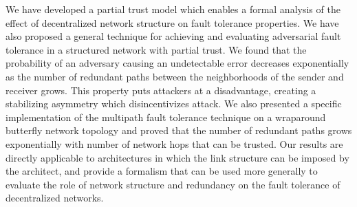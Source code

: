 \documentclass[prodmode,permissions]{acmsmall-ec16}
\begin{document}
We have developed a partial trust model which enables a formal analysis
of the effect of decentralized network structure on fault tolerance properties.
We have also proposed a general technique for achieving and evaluating adversarial
fault tolerance in a structured network with partial trust.
We found that the probability of an adversary causing an undetectable error
decreases exponentially as the number of redundant paths between the
neighborhoods of the sender and receiver grows.
This property puts attackers at a disadvantage, creating a stabilizing
asymmetry which disincentivizes attack.
We also presented a specific implementation of the multipath fault tolerance
technique on a wraparound butterfly network topology and proved that the
number of redundant paths grows exponentially with number of network hops
that can be trusted.
Our results are directly applicable to architectures in which the link structure
can be imposed by the architect,
and provide a formalism that can be used more generally to evaluate the role
of network structure and redundancy on the fault tolerance of decentralized
networks.

\begin{acks}
\end{acks}



\end{document}
